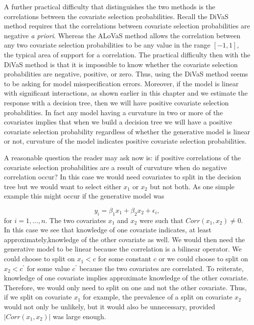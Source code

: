 A further practical difficulty that distinguishes the two methods is the correlations between the covariate selection probabilities. Recall the DiVaS method requires that the correlations between covariate selection probabilities are negative \emph{a priori}. Whereas the ALoVaS method allows the correlation between any two covariate selection probabilities to be any value in the range $[-1,1]$, the typical area of support for a correlation. The practical difficulty then with the DiVaS method is that it is impossible to know whether the covariate selection probabilities are negative, positive, or zero. Thus, using the DiVaS method seems to be asking for model misspecification errors. Moreover, if the model is linear with significant interactions, as shown earlier in this chapter and we estimate the response with a decision tree, then we will have positive covariate selection probabilities. 
In fact any model having a curvature in two or more of the covariates implies that when we build a decision tree we will have a positive covariate selection probability regardless of whether the generative model is linear or not, curvature of the model indicates positive covariate selection probabilities. 

A reasonable question the reader may ask now is: if positive correlations of the covariate selection probabilities are a result of curvature when do negative correlation occur? In this case we would need covariates to split in the decision tree but we would want to select either $x_1$ or $x_2$ but not both. As one simple example this might occur if the generative model was 

\begin{equation}
y_i = \beta_1x_1 + \beta_2x_2 + \epsilon_i,
\end{equation}
for $i=1, \dots, n$. The two covariates $x_1$ and $x_2$ were such that $Corr(x_1, x_2) \neq 0$. In this case we see that knowledge of one covariate indicates, at least approximately,knowledge of the other covariate as well. We would then need the generative model to be linear because the correlation is a bilinear operator. We could choose to split on $x_1<c$ for some constant $c$ or we could choose to split on $x_2 < c^\prime$ for some value $c^\prime$ because the two covariates are correlated. To reiterate, knowledge of one covariate implies approximate knowledge of the other covariate. Therefore, we would only need to split on one and not the other covariate. Thus, if we split on covariate $x_1$ for example, the prevalence of a split on covariate $x_2$ would not only be unlikely, but it would also be unnecessary, provided  $|Corr(x_1, x_2)|$ was large enough. 
 
